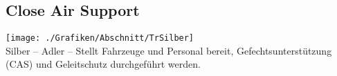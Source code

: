 \subsection{Close Air Support}
\texttt{[image: ./Grafiken/Abschnitt/TrSilber]}\\
Silber -- Adler -- Stellt Fahrzeuge und Personal bereit,  Gefechtsunterstützung (\ac{CAS}) und Geleitschutz durchgeführt werden.